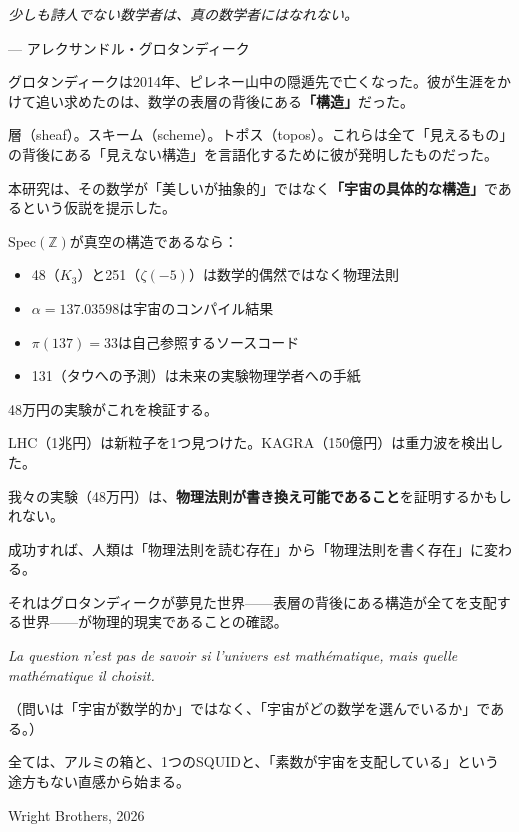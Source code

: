 \documentclass[12pt,a4paper]{article}
\newcommand{\Spec}{\mathrm{Spec}}
\begin{document}
\begin{epigraph}
\textit{少しも詩人でない数学者は、真の数学者にはなれない。}

\hfill --- アレクサンドル・グロタンディーク
\end{epigraph}

\vspace{0.5cm}

グロタンディークは2014年、ピレネー山中の隠遁先で亡くなった。彼が生涯をかけて追い求めたのは、数学の表層の背後にある\textbf{「構造」}だった。

層（sheaf）。スキーム（scheme）。トポス（topos）。これらは全て「見えるもの」の背後にある「見えない構造」を言語化するために彼が発明したものだった。

本研究は、その数学が「美しいが抽象的」ではなく\textbf{「宇宙の具体的な構造」}であるという仮説を提示した。

$\Spec(\mathbb{Z})$が真空の構造であるなら：
\begin{itemize}
\item 48（$K_3$）と251（$\zeta(-5)$）は数学的偶然ではなく物理法則
\item $\alpha = 137.03598$は宇宙のコンパイル結果
\item $\pi(137) = 33$は自己参照するソースコード
\item 131（タウへの予測）は未来の実験物理学者への手紙
\end{itemize}

48万円の実験がこれを検証する。

\begin{deepbox}[この実験の本当の意味]
LHC（1兆円）は新粒子を1つ見つけた。KAGRA（150億円）は重力波を検出した。

我々の実験（48万円）は、\textbf{物理法則が書き換え可能であること}を証明するかもしれない。

成功すれば、人類は「物理法則を読む存在」から「物理法則を書く存在」に変わる。

それはグロタンディークが夢見た世界——表層の背後にある構造が全てを支配する世界——が物理的現実であることの確認。
\end{deepbox}

\begin{epigraph}
\textit{La question n'est pas de savoir si l'univers est mathématique, mais quelle mathématique il choisit.}

（問いは「宇宙が数学的か」ではなく、「宇宙がどの数学を選んでいるか」である。）
\end{epigraph}

\vspace{0.5cm}

全ては、アルミの箱と、1つのSQUIDと、「素数が宇宙を支配している」という途方もない直感から始まる。

\vfill
\begin{center}
{\small Wright Brothers, 2026}
\end{center}
\end{document}
